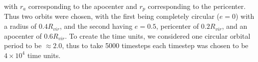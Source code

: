 \documentclass[twocolumn]{article}
\begin{document}
with $r_a$ corresponding to the apocenter and $r_p$ corresponding to the pericenter. Thus two orbits were chosen, with the first being completely circular ($e = 0$) with a radius of $0.4R_{vir}$, and the second having $e = 0.5$, pericenter of $0.2R_{vir}$, and an apocenter of $0.6R_{vir}$. To create the time units, we considered one circular orbital period to be $\approx 2.0$, thus to take 5000 timesteps each timestep was chosen to be $4 \times 10^4$ time units.

%
\end{document}
